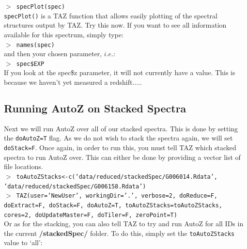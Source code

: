 \documentclass[12pt]{article}
\begin{document}
\hspace{10mm} \texttt{$>$ specPlot(spec)}\\

\texttt{specPlot()} is a TAZ function that allows easily plotting of the spectral structures output by TAZ. Try this now. If you want to see all information available for this spectrum, simply type:\\

 \hspace{10mm} \texttt{$>$ names(spec)} \\
 
 and then your chosen parameter, $i.e.$:\\
 
 
  \hspace{10mm} \texttt{$>$ spec\$EXP} \\
  
 If you look at the spec\$z parameter, it will not currently have a value. This is because we haven't yet measured a redshift.....
 

 \subsection{Running AutoZ on Stacked Spectra}
 
 Next we will run AutoZ over all of our stacked spectra. This is done by setting the \texttt{doAutoZ=T} flag. As we do not wish to stack the spectra again, we will set \texttt{doStack=F}. Once again, in order to run this, you must tell TAZ which stacked spectra to run AutoZ over. This can either be done by providing a vector list of file locations. \\
 
 \hspace{10mm} \texttt{$>$ toAutoZStacks<-c(`data/reduced/stackedSpec/G006014.Rdata',  \\ 'data/reduced/stackedSpec/G006158.Rdata')}\\
 
 \hspace{10mm} \texttt{$>$ TAZ(user='NewUser', workingDir='.', verbose=2, doReduce=F, doExtract=F, doStack=F,  doAutoZ=T, toAutoZStacks=toAutoZStacks, cores=2, doUpdateMaster=F, doTiler=F, zeroPoint=T)}\\ 
 
Or as for the stacking, you can also tell TAZ to try and run AutoZ for all IDs in the current \textbf{/stackedSpec/} folder. To do this, simply set the \texttt{toAutoZStacks} value to `all': \\
  
\end{document}
